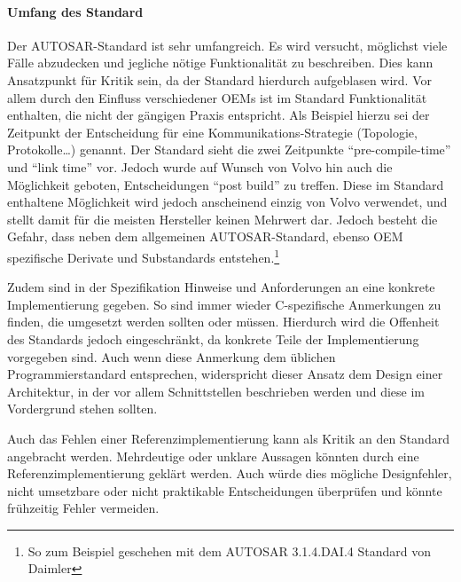 \documentclass[
  a4paper,					    %
  twoside,
  DIV=calc,     				%
  bibliography=totoc,
  cleardoublepage=empty,
  ngerman,     					%
  final       					%
]{scrbook}
\begin{document}
\paragraph{Umfang des Standard}
Der AUTOSAR-Standard ist sehr umfangreich. Es wird versucht, möglichst viele Fälle abzudecken und jegliche nötige Funktionalität zu beschreiben. Dies kann Ansatzpunkt für Kritik sein, da der Standard hierdurch aufgeblasen wird. Vor allem durch den Einfluss verschiedener OEMs ist im Standard Funktionalität enthalten, die nicht der gängigen Praxis entspricht. Als Beispiel hierzu sei der Zeitpunkt der Entscheidung für eine Kommunikations-Strategie (Topologie, Protokolle\dots) genannt.\cite{as_kritik} Der Standard sieht die zwei Zeitpunkte "`pre-compile-time"' und "`link time"' vor. Jedoch wurde auf Wunsch von Volvo hin auch die Möglichkeit geboten, Entscheidungen "`post build"' zu treffen. Diese im Standard enthaltene Möglichkeit wird jedoch anscheinend einzig von Volvo verwendet, und stellt damit für die meisten Hersteller keinen Mehrwert dar. Jedoch besteht die Gefahr, dass neben dem allgemeinen AUTOSAR-Standard, ebenso OEM spezifische Derivate und Substandards entstehen.\footnote{So zum Beispiel geschehen mit dem AUTOSAR 3.1.4.DAI.4 Standard von Daimler}

Zudem sind in der Spezifikation Hinweise und Anforderungen an eine konkrete Implementierung gegeben. So sind immer wieder C-spezifische Anmerkungen zu finden, die umgesetzt werden sollten oder müssen. Hierdurch wird die Offenheit des Standards jedoch eingeschränkt, da konkrete Teile der Implementierung vorgegeben sind.\cite[Seite 20]{autosar_eth} Auch wenn diese Anmerkung dem üblichen Programmierstandard entsprechen, widerspricht dieser Ansatz dem Design einer Architektur, in der vor allem Schnittstellen beschrieben werden und diese im Vordergrund stehen sollten.\cite{objektorientierung}

Auch das Fehlen einer Referenzimplementierung kann als Kritik an den Standard angebracht werden.\cite{Hoffmann200803} Mehrdeutige oder unklare Aussagen könnten durch eine Referenzimplementierung geklärt werden. Auch würde dies mögliche Designfehler, nicht umsetzbare oder nicht praktikable Entscheidungen überprüfen und könnte frühzeitig Fehler vermeiden.\cite{testing} 
\end{document}
